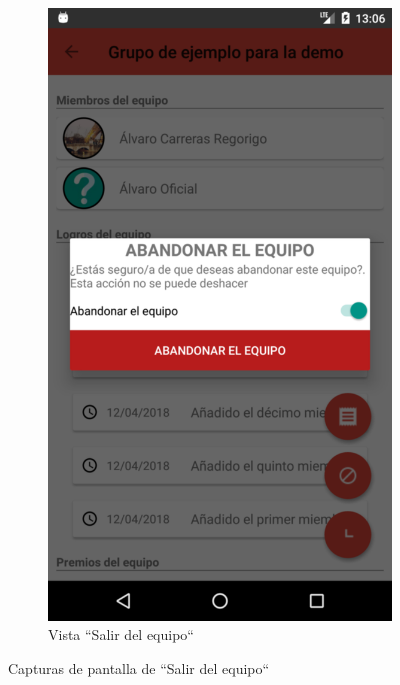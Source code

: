 \documentclass[twoside]{report}
\begin{document}
\begin{figure}[H]
\begin{center}
	\begin{subfigure}[t]{.3\linewidth}
		\includegraphics[scale=0.2]{images/userguide/22.png}
		\caption{Vista “Salir del equipo“}
	\end{subfigure}\hspace{5mm}%
\caption{Capturas de pantalla de “Salir del equipo“}
\end{center}
\end{figure}
\end{document}

